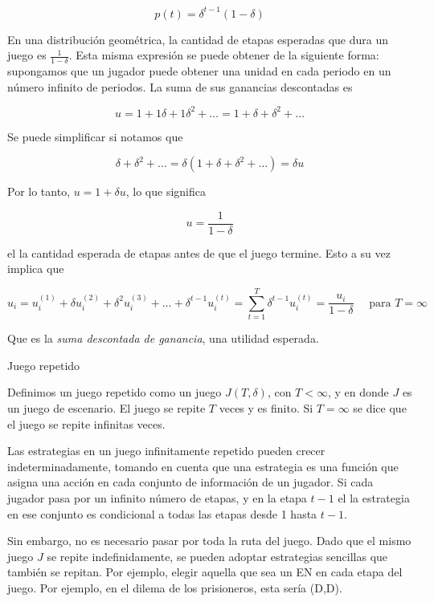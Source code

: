 \documentclass[12pt]{scrartcl}
\begin{document}
\[ 
    p(t)=\delta^{t-1}(1-\delta)
\]

En una distribución geométrica, la cantidad de etapas esperadas que dura un juego es $\frac{1}{1-\delta}$. Esta misma expresión se puede obtener de la siguiente forma: supongamos que un jugador puede obtener una unidad en cada periodo en un número infinito de periodos. La suma de sus ganancias descontadas es

\[ 
u = 1 + 1\delta + 1\delta^2 + \dots = 1 + \delta + \delta^2 + \dots
\]

Se puede simplificar si notamos que

\[ 
    \delta + \delta^2 + \dots = \delta(1 + \delta + \delta^2 + \dots) = \delta u
\]

Por lo tanto, $u=1+\delta u$, lo que significa 

\[u = \frac{1}{1-\delta} \]

el la cantidad esperada de etapas antes de que el juego termine. Esto a su vez implica que

\[ 
    u_i = u_i^{(1)} + \delta u_i^{(2)} + \delta^2 u_i^{(3)} + \dots + \delta^{t-1} u_i^{(t)} = \sum_{t=1}^{T}\delta^{t-1} u_i^{(t)} = \frac{u_i}{1-\delta}\quad \text{ para $T = \infty$}
\]

Que es la \textit{suma descontada de ganancia}, una utilidad esperada.

\begin{mybox}{Juego repetido}
    \begin{defi}
	    Definimos un juego repetido como un juego $J(T,\delta)$, con $T<\infty$, y en donde $J$ es un juego de escenario. El juego se repite $T$ veces y es finito. Si $T = \infty$ se dice que el juego se repite infinitas veces.
    \end{defi}
\end{mybox}

Las estrategias en un juego infinitamente repetido pueden crecer indeterminadamente, tomando en cuenta que una estrategia es una función que asigna una acción en cada conjunto de información de un jugador. Si cada jugador pasa por un infinito número de etapas, y en la etapa $t-1$ el la estrategia en ese conjunto es condicional a todas las etapas desde 1 hasta $t-1$. 

Sin embargo, no es necesario pasar por toda la ruta del juego. Dado que el mismo juego $J$ se repite indefinidamente, se pueden adoptar estrategias sencillas que también se repitan. Por ejemplo, elegir aquella que sea un EN en cada etapa del juego. Por ejemplo, en el dilema de los prisioneros, esta sería (D,D).
\end{document}

